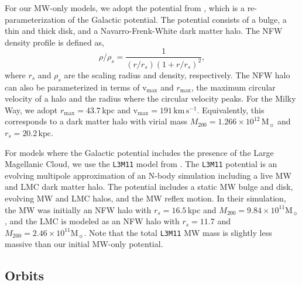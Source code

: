 \documentclass[times,trackchanges, twocolumn, twocolappendix]{aastex701}
\newcommand{\V}{\textrm{v}}
\newcommand{\vmax}{\V_\text{max}}
\newcommand{\rmax}{r_\text{max}}
\newcommand{\kpc}{\text{kpc}}
\newcommand{\kms}{\mathrm{km\,s^{-1}}}
\newcommand{\Mo}{\mathrm{M}_\sun}
\begin{document}
For our MW-only models, we adopt the potential from \citet{EP2020}, which is
a re-parameterization of the \citet{mcmillan2011} Galactic potential.
The potential consists of a \citet{hernquist1990} bulge, a \citet{miyamoto+nagai1975} thin and thick disk, and a Navarro-Frenk-White \citep[][hereafter NFW]{NFW1996, NFW1997} dark matter halo.
The NFW density profile is defined as,
\begin{equation}\label{eq:nfw}{
\rho/\rho_s= \frac{1}{(r/r_s)(1+r/r_s)^2},
}\end{equation}
where $r_s$ and $\rho_s$ are the scaling radius and density, respectively. The NFW halo can also be parameterized in terms of $\vmax$ and $\rmax$, the maximum circular velocity of a halo and the radius where the circular velocity peaks.  
For the Milky Way, we adopt $\rmax = 43.7\,$kpc and $\vmax = 191\,\kms$. Equivalently, this corresponds to a dark matter halo with virial mass  $M_{200} = 1.266\times 10^{12}\,\Mo$ and $r_s=20.2\,\kpc$.



For models where the Galactic potential includes the presence of the Large Magellanic Cloud, we use the \texttt{L3M11} model from
\citet{vasiliev2024}. The \texttt{L3M11} potential is an evolving
multipole approximation of an N-body simulation including a live MW and
LMC dark matter halo. The potential includes a static MW bulge and disk,
evolving MW and LMC halos, and the MW reflex motion. In their
simulation, the MW was initially an NFW halo with $r_s=16.5\,$kpc and
$M_{200}= 9.84\times10^{11}\Mo$, and the LMC is modeled as an NFW halo with
$r_s=11.7$ and $M_{200} = 2.46 \times 10^{11} \Mo$. Note that the total
\texttt{L3M11} MW mass is slightly less massive than our initial \citet{EP2020}
MW-only potential.


\subsection{Orbits}\label{sec:point_orbits}
\end{document}
